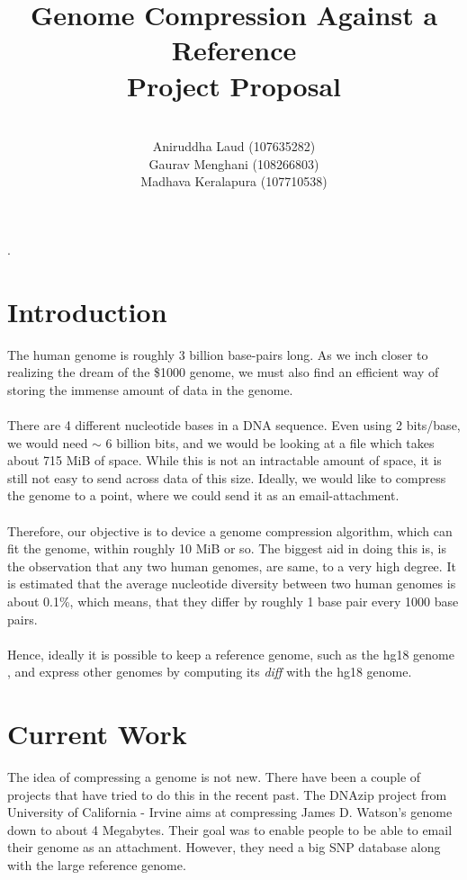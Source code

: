 \documentclass{article}
\title{Genome Compression Against a Reference \\
        Project Proposal \\}
\author{\\
        Aniruddha Laud (107635282)\\
        Gaurav Menghani (108266803)\\
        Madhava Keralapura (107710538)\\}
\begin{document}
\maketitle

\clearpage
.
\clearpage

\tableofcontents

\clearpage

\section {Introduction}

The human genome is roughly 3 billion base-pairs long. As we inch closer to realizing the dream of the \$1000 genome, we must also find an efficient way of storing the immense amount of data in the genome.\\
\\
There are 4 different nucleotide bases in a DNA sequence. Even using 2 bits/base, we would need $\sim$ 6 billion bits, and we would be looking at a file which takes about 715 MiB of space. While this is not an intractable amount of space, it is still not easy to send across data of this size. Ideally, we would like to compress the genome to a point, where we could send it as an email-attachment.\\
\\
Therefore, our objective is to device a genome compression algorithm, which can fit the genome, within roughly 10 MiB or so. The biggest aid in doing this is, is the observation that any two human genomes, are same, to a very high degree. It is estimated that the average nucleotide diversity between two human genomes is about 0.1\%, which means, that they differ by roughly 1 base pair every 1000 base pairs.\cite{jorde04}\\
\\
Hence, ideally it is possible to keep a reference genome, such as the hg18 genome \cite{ucschg18}, and express other genomes by computing its \emph{diff} with the hg18 genome. \\

\section {Current Work}
The idea of compressing a genome is not new. There have been a couple of projects that have tried to do this in the recent past. The DNAzip project \cite{dnazip, dnazip_paper} from University of California - Irvine aims at compressing James D. Watson's genome down to about 4 Megabytes. Their goal was to enable people to be able to email their genome as an attachment. However, they need a big SNP database along with the large reference genome. 
\end{document}
